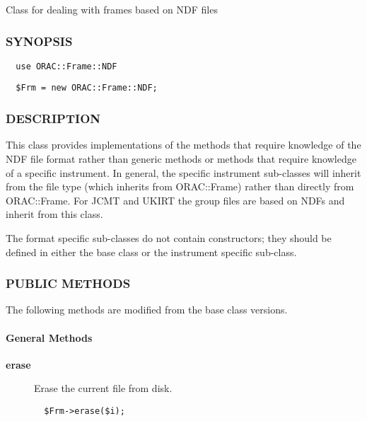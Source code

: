 \begin{description}
Class for dealing with frames based on NDF files

\subsubsection*{SYNOPSIS\label{ORAC::Frame::NDF_SYNOPSIS}}
\begin{verbatim}
  use ORAC::Frame::NDF
\end{verbatim}
\begin{verbatim}
  $Frm = new ORAC::Frame::NDF;
\end{verbatim}
\subsubsection*{DESCRIPTION\label{ORAC::Frame::NDF_DESCRIPTION}}


This class provides implementations of the methods that require
knowledge of the NDF file format rather than generic methods or
methods that require knowledge of a specific instrument.  In general,
the specific instrument sub-classes will inherit from the file type
(which inherits from ORAC::Frame) rather than directly from
ORAC::Frame. For JCMT and UKIRT the group files are based on NDFs and
inherit from this class.



The format specific sub-classes do not contain constructors; they
should be defined in either the base class or the instrument specific
sub-class.

\subsubsection*{PUBLIC METHODS\label{ORAC::Frame::NDF_PUBLIC_METHODS}}


The following methods are modified from the base class versions.

\paragraph*{General Methods\label{ORAC::Frame::NDF_General_Methods}}
\begin{description}

\item[{\textbf{erase}}] \mbox{}

Erase the current file from disk.

\begin{verbatim}
  $Frm->erase($i);
\end{verbatim}



\end{description}
\end{description}
